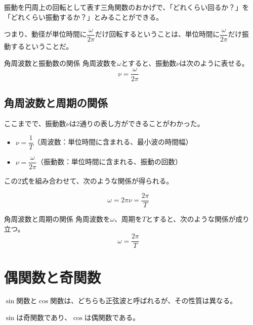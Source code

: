 \documentclass[16pt,b5paper]{book}
\begin{document}
振動を円周上の回転として表す三角関数のおかげで、「どれくらい回るか？」を「どれくらい振動するか？」とみることができる。

つまり、動径が単位時間に$\dfrac{\omega}{2\pi}$だけ回転するということは、単位時間に$\dfrac{\omega}{2\pi}$だけ振動するということだ。

\begin{theorem}{角周波数と振動数の関係}
  \newline
  角周波数を$\omega$とすると、振動数$\nu$は次のように表せる。
  \LARGE
  \begin{equation}
    \nu = \dfrac{\omega}{2\pi}
  \end{equation}
  \normalsize
\end{theorem}

\subsection{角周波数と周期の関係}

ここまでで、振動数$\nu$は2通りの表し方ができることがわかった。

\begin{itemize}
  \item $\nu = \dfrac{1}{T}$（周波数：単位時間に含まれる、最小波の時間幅）
  \item $\nu = \dfrac{\omega}{2\pi}$（振動数：単位時間に含まれる、振動の回数）
\end{itemize}

この2式を組み合わせて、次のような関係が得られる。

\begin{equation}
  \omega = 2\pi\nu = \dfrac{2\pi}{T}
\end{equation}

\begin{theorem}{角周波数と周期の関係}
  \newline
  角周波数を$\omega$、周期を$T$とすると、次のような関係が成り立つ。
  \LARGE
  \begin{equation}
    \omega = \dfrac{2\pi}{T}
  \end{equation}
\end{theorem}

\section{偶関数と奇関数}

$\sin$関数と$\cos$関数は、どちらも正弦波と呼ばれるが、その性質は異なる。

$\sin$は奇関数であり、$\cos$は偶関数である。
\end{document}
